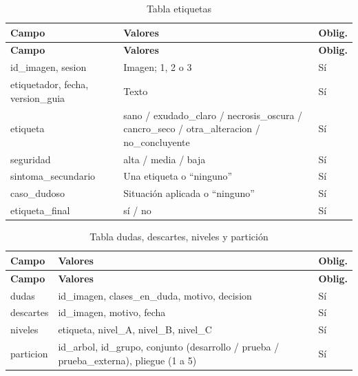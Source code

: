 \documentclass[11pt]{article}
\begin{document}
{\small
\begin{longtable}{|>{\RaggedRight\arraybackslash}p{4.81cm}|>{\RaggedRight\arraybackslash}p{8.27cm}|>{\RaggedRight\arraybackslash}p{1.54cm}|}
\caption{Tabla etiquetas}\\
\hline
\rowcolor{encabezado}\textbf{Campo} & \textbf{Valores} & \textbf{Oblig.} \\ \hline
\endfirsthead
\hline
\rowcolor{encabezado}\textbf{Campo} & \textbf{Valores} & \textbf{Oblig.} \\ \hline
\endhead
id\_imagen, sesion & Imagen; 1, 2 o 3 & Sí \\ \hline
etiquetador, fecha, version\_guia & Texto & Sí \\ \hline
etiqueta & sano / exudado\_claro / necrosis\_oscura / cancro\_seco / otra\_alteracion / no\_concluyente & Sí \\ \hline
seguridad & alta / media / baja & Sí \\ \hline
sintoma\_secundario & Una etiqueta o “ninguno” & Sí \\ \hline
caso\_dudoso & Situación aplicada o “ninguno” & Sí \\ \hline
etiqueta\_final & sí / no & Sí \\ \hline
\end{longtable}}
{\small
\begin{longtable}{|>{\RaggedRight\arraybackslash}p{4.81cm}|>{\RaggedRight\arraybackslash}p{8.27cm}|>{\RaggedRight\arraybackslash}p{1.54cm}|}
\caption{Tabla dudas, descartes, niveles y partición}\\
\hline
\rowcolor{encabezado}\textbf{Campo} & \textbf{Valores} & \textbf{Oblig.} \\ \hline
\endfirsthead
\hline
\rowcolor{encabezado}\textbf{Campo} & \textbf{Valores} & \textbf{Oblig.} \\ \hline
\endhead
dudas & id\_imagen, clases\_en\_duda, motivo, decision & Sí \\ \hline
descartes & id\_imagen, motivo, fecha & Sí \\ \hline
niveles & etiqueta, nivel\_A, nivel\_B, nivel\_C & Sí \\ \hline
particion & id\_arbol, id\_grupo, conjunto (desarrollo / prueba / prueba\_externa), pliegue (1 a 5) & Sí \\ \hline
\end{longtable}}
\end{document}
